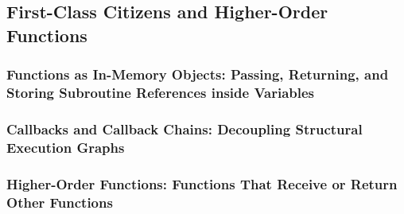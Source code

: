 \subsection{First-Class Citizens and Higher-Order Functions}
\subsubsection{Functions as In-Memory Objects: Passing, Returning, and Storing Subroutine References inside Variables}
\subsubsection{Callbacks and Callback Chains: Decoupling Structural Execution Graphs}
\subsubsection{Higher-Order Functions: Functions That Receive or Return Other Functions}
